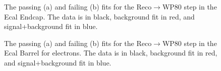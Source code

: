 \begin{thebibliography}{10}
\begin{figure}[htb]
  \begin{center}
    \caption{The passing (a) and failing (b) fits for the Reco$\to$WP80 step in the Ecal Endcap.  
             The data is in black, background fit in red, and signal+background fit in blue.}
  \end{center}
\end{figure}

\begin{figure}[htb]
  \begin{center}
    \caption{The passing (a) and failing (b) fits for the Reco$\to$WP80 step in the Ecal Barrel for electrons.
             The data is in black, background fit in red, and signal+background fit in blue.}
  \end{center}
\end{figure}


\end{thebibliography}
